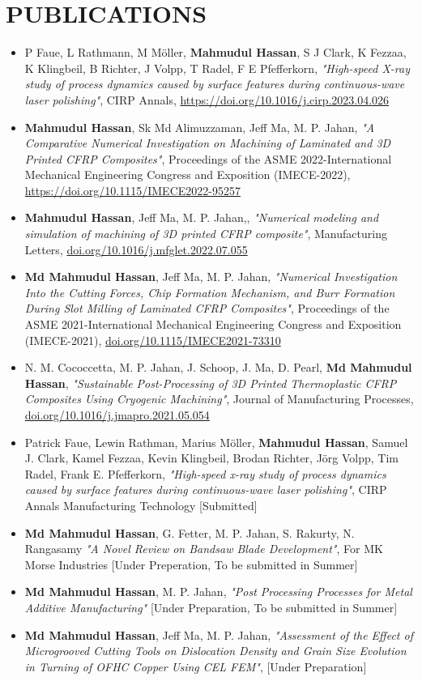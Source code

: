 \documentclass[letterpaper,11pt]{article}
\newcommand{\resumeItem}[1]{
  \item\small{
    {#1 \vspace{-2pt}}
  }
}
\newcommand{\resumeItemListStart}{\begin{itemize}}
\newcommand{\resumeItemListEnd}{\end{itemize}\vspace{-5pt}}
\begin{document}
\section{PUBLICATIONS}
 \resumeItemListStart
                \resumeItem{P Faue, L Rathmann, M Möller, \textbf{Mahmudul Hassan}, S J Clark, K Fezzaa, K Klingbeil, B Richter, J Volpp, T Radel, F E Pfefferkorn,  \textit{"High-speed X-ray study of process dynamics caused by surface features during continuous-wave laser polishing"}, CIRP Annals, \href{https://doi.org/10.1016/j.cirp.2023.04.026}{https://doi.org/10.1016/j.cirp.2023.04.026}}
                \resumeItem{\textbf{Mahmudul Hassan}, Sk Md Alimuzzaman, Jeff Ma, M. P. Jahan, \textit{"A Comparative Numerical Investigation on Machining of Laminated and 3D Printed CFRP Composites"}, Proceedings of the ASME 2022-International Mechanical Engineering Congress and Exposition (IMECE-2022), \href{https://doi.org/10.1115/IMECE2022-95257}{https://doi.org/10.1115/IMECE2022-95257}}
                \resumeItem{\textbf{Mahmudul Hassan}, Jeff Ma, M. P. Jahan,, \textit{"Numerical modeling and simulation of machining of 3D printed CFRP composite"},  Manufacturing Letters, \href{ https://doi.org/10.1016/j.mfglet.2022.07.055}{doi.org/10.1016/j.mfglet.2022.07.055}}
                \resumeItem{\textbf{Md Mahmudul Hassan}, Jeff Ma, M. P. Jahan, \textit{"Numerical Investigation Into the Cutting Forces, Chip Formation Mechanism, and Burr Formation During Slot Milling of Laminated CFRP Composites"}, Proceedings of the ASME 2021-International Mechanical Engineering Congress and Exposition (IMECE-2021), \href{https://doi.org/10.1115/IMECE2021-73310}{ doi.org/10.1115/IMECE2021-73310}}
                \resumeItem{N. M. Cococcetta, M. P. Jahan, J. Schoop, J. Ma, D. Pearl, \textbf{Md Mahmudul Hassan}, \textit{"Sustainable Post-Processing of 3D Printed Thermoplastic CFRP Composites Using Cryogenic Machining"},  Journal of Manufacturing Processes, \href{ http://dx.doi.org/10.1016/j.jmapro.2021.05.054}{doi.org/10.1016/j.jmapro.2021.05.054}}
                \resumeItem{Patrick Faue, Lewin Rathman, Marius Möller, \textbf{Mahmudul Hassan}, Samuel J. Clark, Kamel Fezzaa, Kevin Klingbeil, Brodan Richter, Jörg Volpp, Tim Radel, Frank E. Pfefferkorn, \textit{"High-speed x-ray study of process dynamics caused by surface features during continuous-wave laser polishing"},  CIRP Annals Manufacturing Technology [Submitted]}
                \resumeItem{\textbf{Md Mahmudul Hassan}, G. Fetter, M. P. Jahan, S. Rakurty, N. Rangasamy \textit{"A Novel Review on Bandsaw Blade Development"}, For MK Morse Industries [Under Preperation, To be submitted in Summer]}
                \resumeItem{\textbf{Md Mahmudul Hassan}, M. P. Jahan, \textit{"Post Processing Processes for Metal Additive Manufacturing"} [Under Preparation, To be submitted in Summer]}
                \resumeItem{\textbf{Md Mahmudul Hassan}, Jeff Ma, M. P. Jahan, \textit{"Assessment of the Effect of Microgrooved Cutting Tools on Dislocation Density and Grain Size Evolution in Turning of OFHC Copper Using CEL FEM"}, [Under Preparation]}
                \vspace{-5pt}
            \resumeItemListEnd
\vspace{-6pt}
\end{document}
